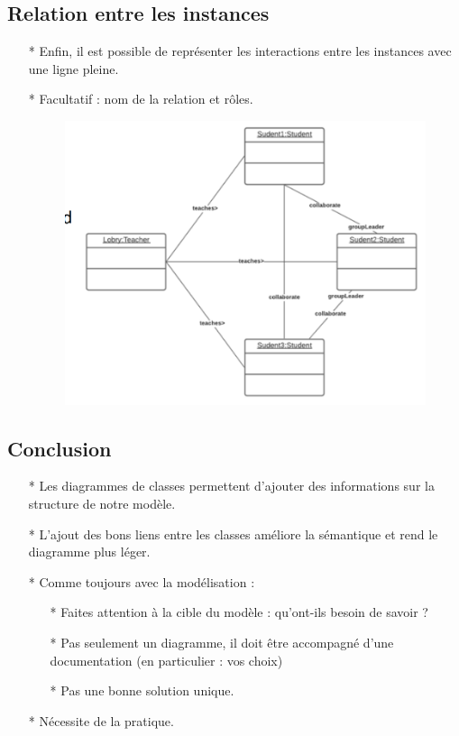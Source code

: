 \documentclass[12pt]{article}
\begin{document}
\subsection{Relation entre les instances}
\begin{itemize}
	\item[* ] Enfin, il est possible de représenter
	les interactions entre les instances
	avec une ligne pleine.
	\item[* ] Facultatif : nom de la relation et
	rôles.\\
	\begin{figure}[!hbtp]
		\centering
		\includegraphics[scale=0.75]{Capture14.PNG}
	\end{figure}
\end{itemize}
\subsection{Conclusion}
\begin{itemize}
	\item[* ]  Les diagrammes de classes permettent d'ajouter des informations sur la structure de notre modèle.
	\item[* ] L'ajout des bons liens entre les classes améliore la sémantique et rend le
	diagramme plus léger.
	\item[* ] Comme toujours avec la modélisation :
	\begin{itemize}
		\item[* ] Faites attention à la cible du modèle : qu'ont-ils besoin de savoir ?
		\item[* ] Pas seulement un diagramme, il doit être accompagné d'une documentation (en particulier : vos choix)
		\item[* ] Pas une bonne solution unique.
	\end{itemize}
\item[* ] Nécessite de la pratique.
\end{itemize}
\end{document}

